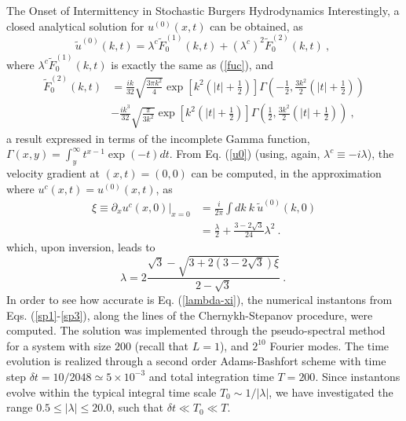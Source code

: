 \begin{chapter}{The Onset of Intermittency in Stochastic Burgers Hydrodynamics}
Interestingly, a closed analytical solution for $u^{(0)}(x,t)$ can be obtained, as
\begin{equation}
\tilde u^{(0)}(k,t) = \lambda^c \tilde F_0^{(1)} (k,t) + (\lambda^c)^2 \tilde F_0^{(2)} (k,t) \ , \ \label{u0}
\end{equation}
where $\lambda^c \tilde F_0^{(1)}(k,t)$ is exactly the same as (\ref{fuc}),
and
\begin{equation} \begin{split}
\tilde F_0^{(2)} (k,t) &= \frac{i k}{32} \sqrt{\frac{3 \pi k^2}{4}} \exp \left [ k^2 \left ( |t| + \frac{1}{2} \right ) \right ] \Gamma \left (-\frac{1}{2}, \frac{3 k^2}{2} \left ( |t|+ \frac{1}{2} \right ) \right )
\\ &-\frac{i k^3}{32} \sqrt{\frac{\pi}{3 k^2}} \exp \left [ k^2 \left ( |t| + \frac{1}{2} \right ) \right ] \Gamma \left (\frac{1}{2}, \frac{3 k^2}{2} \left ( |t|+ \frac{1}{2} \right ) \right ) \ ,
\label{F02}
\end{split} \end{equation}
a result expressed in terms of the incomplete Gamma function, $\Gamma(x,y) = \int_y^\infty t^{x-1} \exp(-t) dt$.
From Eq. (\ref{u0}) (using, again, $\lambda^c \equiv -i \lambda$), the velocity gradient at $(x,t)=(0,0)$ can be
computed, in the approximation where $u^c(x,t) = u^{(0)}(x,t)$, as
\begin{equation} \begin{split}
\xi \equiv \partial_x u^c(x,0)|_{x=0} &= \frac{i}{2 \pi}  \int dk \ k \ \tilde u^{(0)} (k,0) \\
&=\frac{\lambda}{2} + \frac{3 -2\sqrt{3}}{24} \lambda^2 \ .
\end{split} \end{equation}
which, upon inversion, leads to
\begin{equation}
\lambda = 2 \frac{\sqrt{3}  - \sqrt{3 + 2(3 - 2 \sqrt{3}) \xi }}{2-\sqrt{3}} \ . \ \label{lambda-xi}
\end{equation}
In order to see how accurate is Eq. (\ref{lambda-xi}), the numerical instantons from Eqs. (\ref{sp1}-\ref{sp3}), along the lines of the Chernykh-Stepanov procedure, were computed. The solution was implemented through the pseudo-spectral method for a system with size $200$ (recall that $L=1$), and $2^{10}$ Fourier modes. The time evolution is realized through a second order Adams-Bashfort scheme with time step $\delta t = 10/2048 \simeq 5 \times 10^{-3}$ and total integration time $T = 200$. Since instantons evolve within the typical integral time scale $T_0 \sim 1/|\lambda|$, we have investigated the range $0.5 \leq |\lambda| \leq 20.0$, such that $ \delta t \ll T_0 \ll T$.


\end{chapter}
